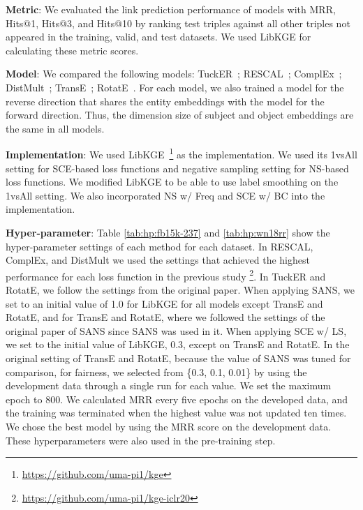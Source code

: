 \noindent\textbf{Metric}: We evaluated the link prediction performance of models with MRR, Hits@1, Hits@3, and Hits@10 by ranking test triples against all other triples not appeared in the training, valid, and test datasets. We used LibKGE for calculating these metric scores.

\noindent\textbf{Model}: We compared the following models:
TuckER~\cite{balazevic-etal-2019-tucker}; RESCAL~\cite{10.5555/2900423.2900470}; ComplEx~\cite{DBLP:conf/icml/TrouillonWRGB16}; DistMult~\cite{yang2015embedding}; TransE~\cite{NIPS2013_1cecc7a7}; RotatE~\cite{DBLP:journals/corr/abs-1902-10197}.
For each model, we also trained a model for the reverse direction that shares the entity embeddings with the model for the forward direction. Thus, the dimension size of subject and object embeddings are the same in all models.

\noindent\textbf{Implementation}: We used LibKGE~\cite{libkge}\footnote{\url{https://github.com/uma-pi1/kge}} as the implementation.
We used its 1vsAll setting for SCE-based loss functions and negative sampling setting for NS-based loss functions.
We modified LibKGE to be able to use label smoothing on the 1vsAll setting.
We also incorporated NS w/ Freq and SCE w/ BC into the implementation.

\noindent\textbf{Hyper-parameter}: Table \ref{tab:hp:fb15k-237} and \ref{tab:hp:wn18rr} show the hyper-parameter settings of each method for each dataset.
In RESCAL, ComplEx, and DistMult we used the settings that achieved the highest performance for each loss function in the previous study \cite{Ruffinelli2020You}\footnote{\url{https://github.com/uma-pi1/kge-iclr20}}.
In TuckER and RotatE, we follow the settings from the original paper. When applying SANS, we set  to an initial value of 1.0 for LibKGE for all models except TransE and RotatE, and for TransE and RotatE, where we followed the settings of the original paper of SANS since SANS was used in it.
When applying SCE w/ LS, we set  to the initial value of LibKGE, 0.3, except on TransE and RotatE.
In the original setting of TransE and RotatE, because the value of SANS was tuned for comparison, for fairness, we selected  from \{0.3, 0.1, 0.01\} by using the development data through a single run for each value.
We set the maximum epoch to 800.
We calculated MRR every five epochs on the developed data, and the training was terminated when the highest value was not updated ten times.
We chose the best model by using the MRR score on the development data. 
These hyperparameters were also used in the pre-training step.

